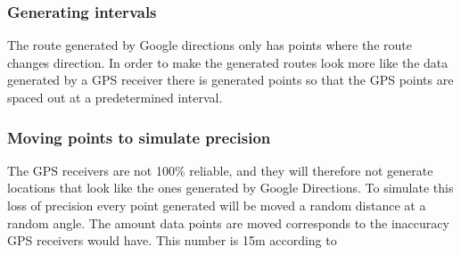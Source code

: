 \subsubsection{Generating intervals}
The route generated by Google directions only has points where the route changes direction.
In order to make the generated routes look more like the data generated by a GPS receiver there is generated points so that the GPS points are spaced out at a predetermined interval.

\subsubsection{Moving points to simulate precision}
The GPS receivers are not 100\% reliable, and they will therefore not generate locations that look like the ones generated by Google Directions.
To simulate this loss of precision every point generated will be moved a random distance at a random angle.
The amount data points are moved corresponds to the inaccuracy GPS receivers would have. This number is 15m according to \citet{garmingps}

